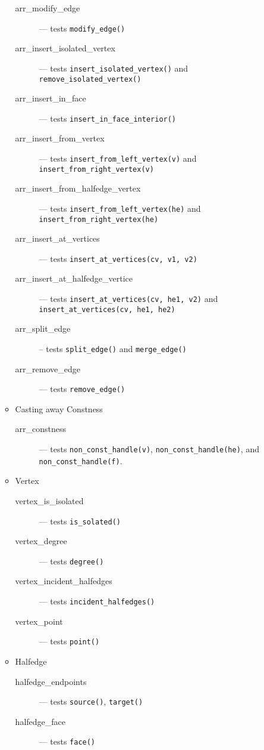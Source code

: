 \documentclass[11pt,a4paper]{article}
\begin{document}
\begin{itemize}
\begin{itemize}
\begin{description}
    \item[arr\_modify\_edge] --- tests {\tt modify\_edge()}
    \item[arr\_insert\_isolated\_vertex] --- tests
      {\tt insert\_isolated\_vertex()} and {\tt remove\_isolated\_vertex()}
    \item[arr\_insert\_in\_face] --- tests {\tt insert\_in\_face\_interior()}
    \item[arr\_insert\_from\_vertex] --- tests
      {\tt insert\_from\_left\_vertex(v)} and
      {\tt insert\_from\_right\_vertex(v)}
    \item[arr\_insert\_from\_halfedge\_vertex] --- tests
      {\tt insert\_from\_left\_vertex(he)} and
      {\tt insert\_from\_right\_vertex(he)}
    \item[arr\_insert\_at\_vertices] --- tests
      {\tt insert\_at\_vertices(cv, v1, v2)}
    \item[arr\_insert\_at\_halfedge\_vertice] --- tests
      {\tt insert\_at\_vertices(cv, he1, v2)} and
      {\tt insert\_at\_vertices(cv, he1, he2)}
    \item[arr\_split\_edge] -- tests {\tt split\_edge()} and {\tt merge\_edge()}
    \item[arr\_remove\_edge] --- tests {\tt remove\_edge()}
    \end{description}  
  \item Casting away Constness
    \begin{description}
    \item[arr\_constness] --- tests {\tt non\_const\_handle(v)},
      {\tt non\_const\_handle(he)}, and {\tt non\_const\_handle(f)}.
    \end{description}
  \item Vertex
    \begin{description}
    \item[vertex\_is\_isolated] --- tests {\tt is\_solated()}
    \item[vertex\_degree] --- tests {\tt degree()}
    \item[vertex\_incident\_halfedges] --- tests {\tt incident\_halfedges()}
    \item[vertex\_point] --- tests {\tt point()}
    \end{description}
  \item Halfedge
    \begin{description}
    \item[halfedge\_endpoints] --- tests {\tt source()}, {\tt target()}
    \item[halfedge\_face] --- tests {\tt face()}

\end{description}
\end{itemize}
\end{itemize}
\end{document}
